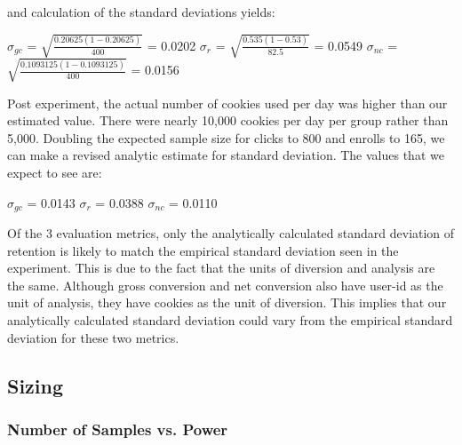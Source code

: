 \documentclass[paper=a4, fontsize=11pt]{scrartcl} %
\numberwithin{equation}{section} %
\numberwithin{figure}{section} %
\numberwithin{table}{section} %
\begin{document}
and calculation of the standard deviations yields: \newline

$\sigma_{gc}$ = $\sqrt{\frac{ 0.20625 (1 -  0.20625)}{400}}$ = 0.0202 \newline
$\sigma_{r}$ = $\sqrt{\frac{ 0.535 (1 -  0.53)}{82.5}}$ = 0.0549 \newline
$\sigma_{nc}$ = $\sqrt{\frac{ 0.1093125 (1 -  0.1093125)}{400}}$ = 0.0156
\newline

Post experiment, the actual number of cookies used per day was higher than our estimated value.  There were nearly 10,000 cookies per day per group rather than 5,000.  Doubling the expected sample size for clicks to 800 and enrolls to 165, we can make a revised analytic estimate for standard deviation.  The values that we expect to see are:
\newline

$\sigma_{gc}$ = 0.0143\newline
$\sigma_{r}$ = 0.0388\newline
$\sigma_{nc}$ = 0.0110
\newline

Of the 3 evaluation metrics, only the analytically calculated standard deviation of retention is likely to match the empirical standard deviation seen in the experiment.  This is due to the fact that the units of diversion and analysis are the same.  Although gross conversion and net conversion also have user-id as the unit of analysis, they have cookies as the unit of diversion.  This implies that our analytically calculated standard deviation could vary from the empirical standard deviation for these two metrics. \newline


\subsection{Sizing}

\subsubsection{Number of Samples vs. Power}

\end{document}
